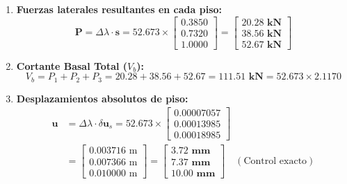 \documentclass[11pt,letterpaper]{article}
\begin{document}
\begin{examplebox}
\begin{enumerate}
    \item \textbf{Fuerzas laterales resultantes en cada piso:}
    \begin{equation}
        \mathbf{P} = \Delta \lambda \cdot \mathbf{s} = 52.673 \times \begin{bmatrix} 0.3850 \\ 0.7320 \\ 1.0000 \end{bmatrix} =
        \begin{bmatrix}
            \mathbf{20.28\text{ kN}} \\
            \mathbf{38.56\text{ kN}} \\
            \mathbf{52.67\text{ kN}}
        \end{bmatrix}
    \end{equation}
    
    \item \textbf{Cortante Basal Total ($V_b$):}
    \begin{equation}
        V_b = P_1 + P_2 + P_3 = 20.28 + 38.56 + 52.67 = \mathbf{111.51\text{ kN}} = 52.673 \times 2.1170
    \end{equation}
    
    \item \textbf{Desplazamientos absolutos de piso:}
    \begin{align}
        \mathbf{u} &= \Delta \lambda \cdot \delta \mathbf{u}_s = 52.673 \times \begin{bmatrix} 0.00007057 \\ 0.00013985 \\ 0.00018985 \end{bmatrix} \nonumber\\
        &= \begin{bmatrix}
            0.003716\text{ m} \\
            0.007366\text{ m} \\
            0.010000\text{ m}
        \end{bmatrix} =
        \begin{bmatrix}
            \mathbf{3.72\text{ mm}} \\
            \mathbf{7.37\text{ mm}} \\
            \mathbf{10.00\text{ mm}}
        \end{bmatrix} \quad (\text{Control exacto})
    \end{align}
    

\end{enumerate}
\end{examplebox}
\end{document}
